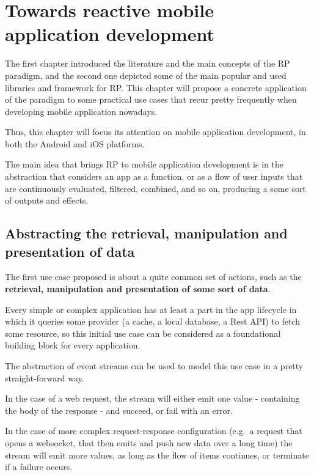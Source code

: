 \chapter{Towards reactive mobile application development}\label{towards-reactive-mobile-application-development}

The first chapter introduced the literature and the main concepts of the
RP paradigm, and the second one depicted some of the main popular and
used libraries and framework for RP. This chapter will propose a
concrete application of the paradigm to some practical use cases that
recur pretty frequently when developing mobile application nowadays.

Thus, this chapter will focus its attention on mobile application
development, in both the Android and iOS platforms.

The main idea that brings RP to mobile application development is in the
abstraction that considers an app as a function, or as a flow of user
inputs that are continuously evaluated, filtered, combined, and so on,
producing a some sort of outputs and effects.


\section{Abstracting the retrieval, manipulation and presentation of
data}\label{abstracting-the-retrieval-manipulation-and-presentation-of-data}

The first use case proposed is about a quite common set of actions, such
as the \textbf{retrieval, manipulation and presentation of some sort of
data}.

Every simple or complex application has at least a part in the app
lifecycle in which it queries some provider (a cache, a local database,
a Rest API) to fetch some resource, so this initial use case can be
considered as a foundational building block for every application.

The abstraction of event streams can be used to model this use case in a
pretty straight-forward way.

In the case of a web request, the stream will either emit one value -
containing the body of the response - and succeed, or fail with an error.

In the case of more complex request-response configuration (e.g.~a
request that opens a websocket, that then emits and push new data over
a long time) the stream will emit more values, as long as the flow of
items continues, or terminate if a failure occurs.

